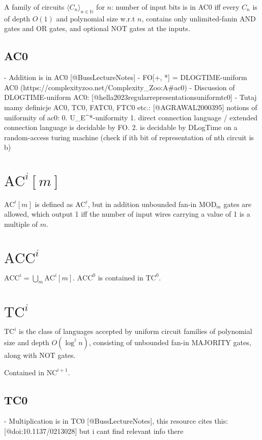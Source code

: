 A family of circuits $\langle C_n \rangle_{n \in \mathbb{N}}$ for $n$:
number of input bits is in AC0 iff every $C_n$ is of depth $O(1)$ and polynomial 
size w.r.t $n$, contains only unlimited-fanin AND gates and OR gates, and optional 
NOT gates at the inputs. 

\subsection{AC0}
- Addition is in AC0 [@BussLectureNotes]
- FO[+, *] = DLOGTIME-uniform AC0 (https://complexityzoo.net/Complexity_Zoo:A#ac0)
- Discussion of DLOGTIME-uniform AC0: [@hella2023regularrepresentationsuniformtc0]
- Tutaj mamy definicje AC0, TC0, FATC0, FTC0 etc.: [@AGRAWAL2000395]
notions of uniformity of ac0:
0. U_{E^*}-uniformity
1. direct connection language / extended connection language is decidable by FO.
2. is decidable by DLogTime on a random-access turing machine (check if ith bit of representation of nth circuit is b)



\section{\texorpdfstring{$\text{AC}^i[m]$}{AC\string^i[m]}}
$\text{AC}^i[m]$ is defined as $\text{AC}^i$, but in addition unbounded fan-in $\text{MOD}_m$ gates
are allowed, which output 1 iff the number of input wires carrying a value of 1 is a
multiple of $m$.

\section{\texorpdfstring{$\text{ACC}^i$}{ACC\string^i}}
$\text{ACC}^i = \bigcup_m \text{AC}^i[m]$. $\text{ACC}^0$ is contained in $\text{TC}^0$.

\section{\texorpdfstring{$\text{TC}^i$}{TC\string^i}}
$\text{TC}^i$ is the class of languages accepted by uniform circuit families 
of polynomial size and depth $O(\log^i n)$, consisting of unbounded fan-in MAJORITY
gates, along with NOT gates.

Contained in $\text{NC}^{i + 1}$.
\subsection{TC0}
- Multiplication is in TC0 [@BussLectureNotes], this resource cites this: [@doi:10.1137/0213028] but i cant find relevant info there


